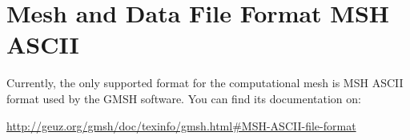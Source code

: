 %
%
%
%


\section{Mesh and Data File Format MSH ASCII}
\label{mesh_file}

Currently, the only supported format for the computational mesh is MSH ASCII format used
by the GMSH software. You can find its documentation on:

\url{http://geuz.org/gmsh/doc/texinfo/gmsh.html#MSH-ASCII-file-format}

